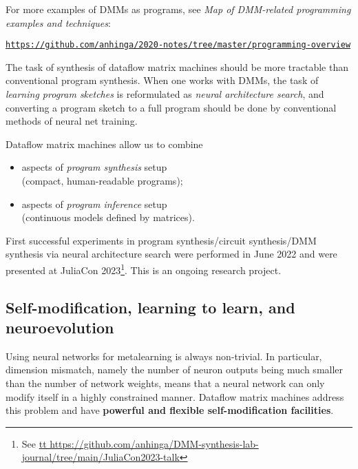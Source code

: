 \documentclass{article}
\begin{document}
For more examples of DMMs as programs, see {\em Map of DMM-related programming examples and techniques}: 

\hspace{0.3in}\href{https://github.com/anhinga/2020-notes/tree/master/programming-overview}{\tt https://github.com/anhinga/2020-notes/tree/master/programming-overview}

\vspace{0.1in}

The task of synthesis of dataflow matrix machines
should be more tractable than conventional program synthesis. When one works with DMMs, the task of
{\em learning program sketches} is reformulated as {\em neural architecture search},
and converting a program sketch to a full program should be done by
conventional methods of neural net training. 

\vspace{0.1in}
\noindent
Dataflow matrix machines allow us  to combine

  \begin{itemize}
      \item aspects of {\em program synthesis} setup\\ (compact, human-readable programs);
      \item aspects of {\em program inference} setup\\ (continuous models defined by matrices).
  \end{itemize}

First successful experiments in program synthesis/circuit synthesis/DMM synthesis via neural architecture search
were performed in June 2022 and were presented at JuliaCon 2023\footnote{See
\href{https://github.com/anhinga/DMM-synthesis-lab-journal/tree/main/JuliaCon2023-talk}{tt
https://github.com/anhinga/DMM-synthesis-lab-journal/tree/main/JuliaCon2023-talk}}. This is an ongoing research
project.

\subsection{Self-modification, learning to learn, and neuroevolution} \label{sec:selfref}

Using neural networks for metalearning
is always non-trivial. In particular, dimension mismatch, namely the number of neuron outputs 
being much smaller than the number of network weights,
means that a neural network
can only modify itself in a highly constrained manner. Dataflow matrix machines address
this problem and have {\bf powerful and flexible self-modification facilities}.
\end{document}
